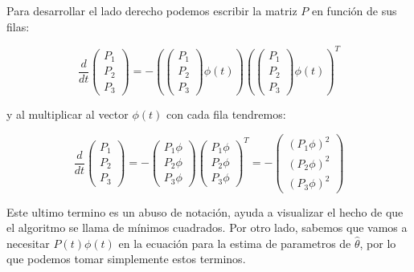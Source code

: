                 Para desarrollar el lado derecho podemos escribir la matriz $P$ en función de sus filas:

                \begin{equation*}
                    \frac{d}{dt}
                    \begin{pmatrix}
                        P_1 \\
                        P_2 \\
                        P_3
                    \end{pmatrix} = - \left(
                    \begin{pmatrix}
                        P_1 \\
                        P_2 \\
                        P_3
                    \end{pmatrix} \phi(t) \right) \left(
                    \begin{pmatrix}
                        P_1 \\
                        P_2 \\
                        P_3
                        \end{pmatrix} \phi(t) \right)^T
                \end{equation*}

                y al multiplicar al vector $\phi(t)$ con cada fila tendremos:

                \begin{equation*}
                    \frac{d}{dt}
                    \begin{pmatrix}
                        P_1 \\
                        P_2 \\
                        P_3
                    \end{pmatrix} = -
                    \begin{pmatrix}
                        P_1 \phi \\
                        P_2 \phi \\
                        P_3 \phi
                    \end{pmatrix}
                    \begin{pmatrix}
                        P_1 \phi \\
                        P_2 \phi \\
                        P_3 \phi
                    \end{pmatrix}^T = -
                    \begin{pmatrix}
                        (P_1 \phi)^2 \\
                        (P_2 \phi)^2 \\
                        (P_3 \phi)^2
                    \end{pmatrix}
                \end{equation*}

                Este ultimo termino es un abuso de notación, ayuda a visualizar el hecho de que el algoritmo se llama de mínimos cuadrados.
                Por otro lado, sabemos que vamos a necesitar $P(t) \phi(t)$ en la ecuación para la estima de parametros de $\hat{\theta}$, por lo que podemos tomar simplemente estos terminos.
